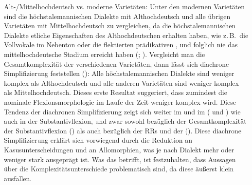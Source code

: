 {Alt-/Mittelhochdeutsch vs. moderne Varietäten:} Unter den modernen Varietäten sind die höchstalemannischen Dialekte mit Althochdeutsch und alle übrigen Varietäten mit Mittelhochdeutsch zu vergleichen, da die höchstalemannischen Dialekte etliche Eigenschaften des Althochdeutschen erhalten haben, wie z.\,B.\ die Vollvokale im Nebenton oder die flektierten prädikativen , und folglich nie das mittelhochdeutsche Stadium erreicht haben (\citealt[835]{Wiesinger1983}; \citealt[153–236]{Hotzenköcherle1984}). Vergleicht man die Gesamtkomplexität der verschiedenen Varietäten, dann lässt sich diachrone Simplifizierung feststellen (): Alle höchstalemannischen Dialekte sind weniger komplex als Althochdeutsch und alle anderen Varietäten sind weniger komplex als Mittelhochdeutsch. Dieses erste Resultat suggeriert, dass zumindest die nominale Flexionsmorphologie im Laufe der Zeit weniger komplex wird. Diese Tendenz der diachronen Simplifizierung zeigt sich weiter im  und im  ( und ) wie auch in der Substantivflexion, und zwar sowohl bezüglich der Gesamtkomplexität der Substantivflexion () als auch bezüglich der RRs und der  (). Diese diachrone Simplifizierung erklärt sich vorwiegend durch die Reduktion an Kasusunterscheidungen und an Allomorphien, was je nach Dialekt mehr oder weniger stark ausgeprägt ist. Was das  betrifft, ist festzuhalten, dass Aussagen über die Komplexitätsunterschiede problematisch sind, da diese äußerst klein ausfallen.

